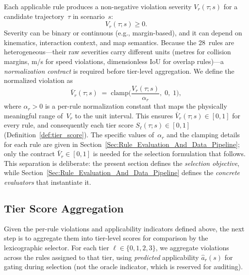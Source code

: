 Each applicable rule produces a non-negative violation severity $V_r(\tau;s)$ for a candidate trajectory~$\tau$ in scenario~$s$:
\begin{equation}
V_r(\tau;s)\ge 0.
\end{equation}
Severity can be binary or continuous (e.g., margin-based), and it can depend on kinematics, interaction context, and map semantics.  Because the 28~rules are heterogeneous---their raw severities carry different units (metres for collision margins, m/s for speed violations, dimensionless IoU for overlap
rules)---a \emph{normalization contract} is required before tier-level aggregation.  We define the normalized violation as 
\begin{equation}
\label{eq:normalization_contract}
\bar{V}_r(\tau;s) \;=\; \mathrm{clamp}\!\Big(\frac{V_r(\tau;s)}{\alpha_r},\;0,\;1\Big),
\end{equation}
where $\alpha_r > 0$ is a per-rule normalization constant that maps the physically meaningful range of~$V_r$ to the unit interval. This ensures $\bar{V}_r(\tau;s)\in[0,1]$ for every rule, and consequently each tier score $S_\ell(\tau;s)\in[0,1]$ (Definition~\ref{def:tier_score}). The specific values of~$\alpha_r$ and the clamping details for each rule are given in Section~\ref{Sec:Rule_Evaluation_And_Data_Pipeline}; only the
contract $\bar{V}_r\in[0,1]$ is needed for the selection formulation that follows.  This separation is deliberate: the present section defines the \emph{selection objective}, while Section~\ref{Sec:Rule_Evaluation_And_Data_Pipeline} defines the \emph{concrete evaluators} that instantiate it.

\subsection{Tier Score Aggregation}
\label{subsec:tier_aggregation}

Given the per-rule violations and applicability indicators defined above, the next step is to aggregate them into tier-level scores for comparison by the lexicographic selector.  For each tier $\ell \in \{0,1,2,3\}$, we aggregate violations across the rules assigned to that tier, using \emph{predicted} applicability $\hat{a}_r(s)$ for gating during selection (not the oracle indicator, which is reserved for auditing).

